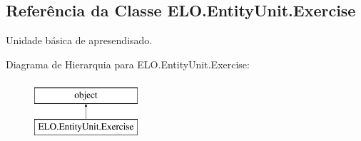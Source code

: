 \hypertarget{classELO_1_1EntityUnit_1_1Exercise}{\subsection{Referência da Classe E\-L\-O.\-Entity\-Unit.\-Exercise}
\label{classELO_1_1EntityUnit_1_1Exercise}
}


Unidade básica de apresendisado.  


Diagrama de Hierarquia para E\-L\-O.\-Entity\-Unit.\-Exercise\-:\begin{figure}[H]
\begin{center}
\leavevmode
\includegraphics[height=2.000000cm]{d5/d6a/classELO_1_1EntityUnit_1_1Exercise}
\end{center}
\end{figure}
